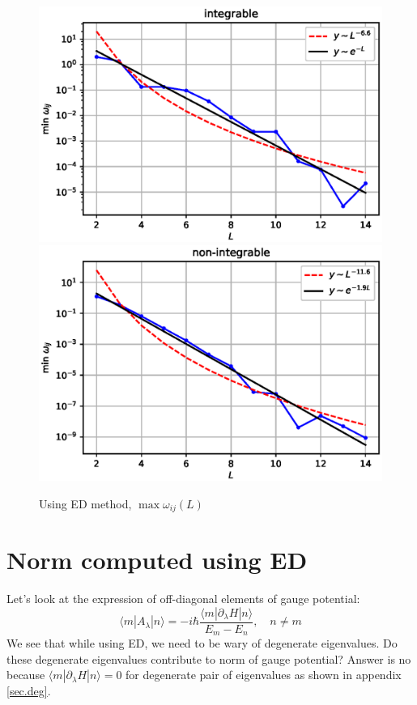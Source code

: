 \documentclass[11pt,a4paper]{article}
\begin{document}
\begin{figure}[!ht]
\begin{center}
\includegraphics[scale=0.535]{new_pics/v2_minwij_int.eps}
\includegraphics[scale=0.535]{new_pics/v2_minwij_nonint.eps}
\caption{Using ED method,  $\max \omega_{ij}(L)$}
\end{center}
\end{figure}


\section{Norm computed using ED}

Let's look at the expression of off-diagonal elements of gauge potential:
\begin{equation}
\langle m |A_{\lambda} | n \rangle =  -i \hbar \dfrac{\langle m |\partial_{\lambda}H | n \rangle}{E_m-E_n}, \quad n \neq m
\end{equation}
We see that while using ED, we need to be wary of degenerate eigenvalues. Do these degenerate eigenvalues contribute to norm of gauge potential? Answer is no because $\langle m |\partial_{\lambda}H | n \rangle=0$ for degenerate pair of eigenvalues as shown in appendix \ref{sec.deg}.
\end{document}
